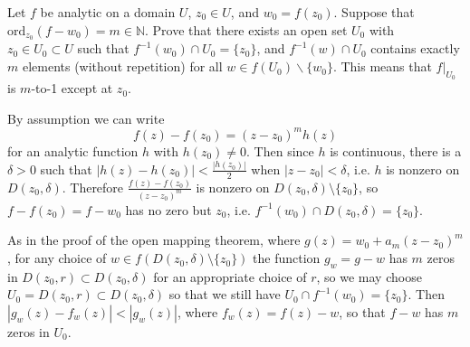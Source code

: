 \documentclass{article}
\newcommand\ord{\mathrm{ord}}
\newcounter{Problem}
\newenvironment{Problem}{\begin{Exercise}[name={Problem},
                                          counter={Problem}]}
                        {\end{Exercise}}
\begin{document}
\begin{Problem}
Let $f$ be analytic on a domain $U$, $z_0 \in U$, and $w_0 = f(z_0)$.
Suppose that $\ord_{z_0} (f - w_0) = m \in \mathbb{N}$. Prove that
there exists an open set $U_0$ with $z_0 \in U_0 \subset U$ such that
$f^{-1}(w_0) \cap U_0 = \{ z_0 \}$, and $f^{-1}(w) \cap U_0$ contains
exactly $m$ elements (without repetition) for all
$w \in f(U_0) \backslash \{ w_0 \}$. This means that $f|_{U_0}$ is
$m$-to-1 except at $z_0$.
\end{Problem}

\begin{Answer}
By assumption we can write
$$
f(z) - f(z_0) = (z - z_0)^m h(z)
$$
for an analytic function $h$ with $h(z_0) \neq 0$. Then since $h$ is
continuous, there is a $\delta > 0$ such that
$|h(z) - h(z_0)| < \frac{|h(z_0)|}{2}$ when $|z - z_0| < \delta$, i.e.
$h$ is nonzero on $D(z_0, \delta)$. Therefore
$\frac{f(z) - f(z_0)}{(z - z_0)^m}$ is nonzero on
$D(z_0, \delta) \setminus \{ z_0 \}$, so $f - f(z_0) = f - w_0$
has no zero but $z_0$, i.e.
$f^{-1}(w_0) \cap D(z_0, \delta) = \{ z_0 \}$.

As in the proof of the open mapping theorem,
where $g(z) = w_0 + a_m (z - z_0)^m$,
for any choice of $w \in f(D(z_0, \delta) \setminus \{ z_0 \})$
the function $g_w = g - w$ has $m$ zeros in
$D(z_0, r) \subset D(z_0, \delta)$
for an appropriate choice of $r$, so we may choose
$U_0 = D(z_0, r) \subset D(z_0, \delta)$ so that we still have
$U_0 \cap f^{-1}(w_0) = \{ z_0 \}$. Then
$|g_w(z) - f_w(z)| < |g_w(z)|$, where $f_w(z) = f(z) - w$, so that
$f - w$ has $m$ zeros in $U_0$.


\end{Answer}
\end{document}
